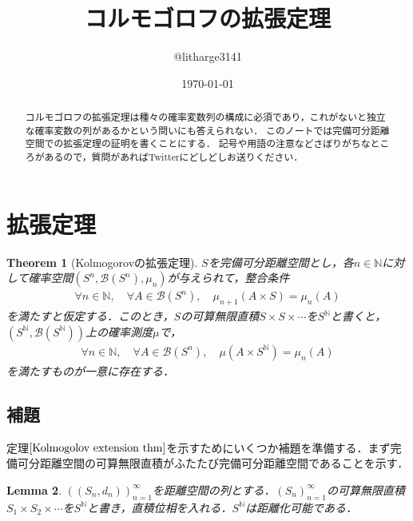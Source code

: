 \documentclass[dvipdfmx,autodetect-engine]{jsarticle}
\title{コルモゴロフの拡張定理}
\author{@litharge3141}
\date{\today}
\newtheorem{theorem}{Theorem}[section]
\newtheorem{lemma}[theorem]{Lemma}
\theoremstyle{remark}
\theoremstyle{definition}
\begin{document}
\maketitle

\begin{abstract}
コルモゴロフの拡張定理は種々の確率変数列の構成に必須であり，これがないと独立な確率変数の列があるかという問いにも答えられない．
このノートでは完備可分距離空間での拡張定理の証明を書くことにする．
記号や用語の注意などさぼりがちなところがあるので，質問があればTwitterにどしどしお送りください．
\end{abstract}

\section{拡張定理}
    \begin{theorem}[Kolmogorovの拡張定理]\label{Kolmogolov extension thm}
    $S$を完備可分距離空間とし，各$n \in \mathbb{N}$に対して確率空間$(S^n,\mathcal{B}(S^n),\mu_n)$が与えられて，整合条件
    \begin{align}
        \forall n \in \mathbb{N},\quad \forall A \in \mathcal{B}(S^n), \quad \mu_{n+1}(A\times S) = \mu_n (A)
    \end{align}
    を満たすと仮定する．このとき，$S$の可算無限直積$S\times S\times \cdots $を$S^{\mathbb{N}}$と書くと，$(S^{\mathbb{N}},\mathcal{B}(S^{\mathbb{N}}))$上の確率測度$\mu$で，
    \begin{align}
        \forall n \in \mathbb{N}, \quad \forall A \in \mathcal{B}(S^n),\quad \mu (A\times S^{\mathbb{N}}) = \mu_n(A)
    \end{align}
    を満たすものが一意に存在する．
    \end{theorem}
    
\subsection{補題}
    定理$\ref{Kolmogolov extension thm}$を示すためにいくつか補題を準備する．まず完備可分距離空間の可算無限直積がふたたび完備可分距離空間であることを示す．
    
    \begin{lemma}\label{prod_metrizible}
    $((S_n,d_n))_{n=1}^{\infty}$を距離空間の列とする．$(S_n)_{n=1}^{\infty}$の可算無限直積$S_1 \times S_2 \times \cdots$を$S^{\mathbb{N}}$と書き，直積位相を入れる．$S^{\mathbb{N}}$は距離化可能である．
    \end{lemma}
    
\end{document}
